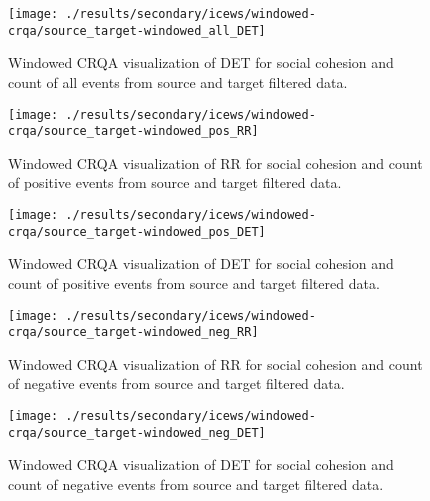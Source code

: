 \documentclass[english,man]{apa6}
\begin{document}
\begin{appendix}
\begin{figure}[H]
\end{figure}
\begin{figure}[H]
\texttt{[image: ./results/secondary/icews/windowed-crqa/source\_target-windowed\_all\_DET]} \caption{Windowed CRQA visualization of DET for social cohesion and count of all events from source and target filtered data.}\label{fig:plot-DET-source-targ-all-secondary-icews}
\end{figure}
\begin{figure}[H]
\texttt{[image: ./results/secondary/icews/windowed-crqa/source\_target-windowed\_pos\_RR]} \caption{Windowed CRQA visualization of RR for social cohesion and count of positive events from source and target filtered data.}\label{fig:plot-RR-source-targ-pos-secondary-icews}
\end{figure}
\begin{figure}[H]
\texttt{[image: ./results/secondary/icews/windowed-crqa/source\_target-windowed\_pos\_DET]} \caption{Windowed CRQA visualization of DET for social cohesion and count of positive events from source and target filtered data.}\label{fig:plot-DET-source-targ-pos-secondary-icews}
\end{figure}
\begin{figure}[H]
\texttt{[image: ./results/secondary/icews/windowed-crqa/source\_target-windowed\_neg\_RR]} \caption{Windowed CRQA visualization of RR for social cohesion and count of negative events from source and target filtered data.}\label{fig:plot-RR-source-targ-neg-secondary-icews}
\end{figure}
\begin{figure}[H]
\texttt{[image: ./results/secondary/icews/windowed-crqa/source\_target-windowed\_neg\_DET]} \caption{Windowed CRQA visualization of DET for social cohesion and count of negative events from source and target filtered data.}\label{fig:plot-DET-source-targ-neg-secondary-icews}
\end{figure}
\end{appendix}
\end{document}

